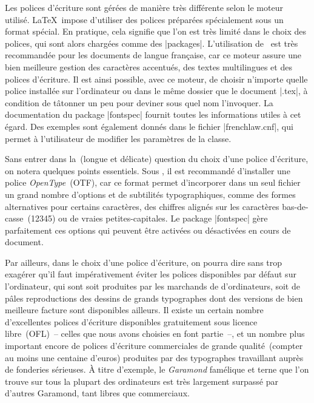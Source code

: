 Les polices d'écriture sont gérées de manière très différente selon le moteur utilisé. \LaTeX\ impose d'utiliser des polices préparées spécialement sous un format spécial. En pratique, cela signifie que l'on est très limité dans le choix des polices, qui sont alors chargées comme des |packages|. L'utilisation de \XeLaTeX\ est très recommandée pour les documents de langue française, car ce moteur assure une bien meilleure gestion des caractères accentués, des textes multilingues et des polices d'écriture. Il est ainsi possible, avec ce moteur, de choisir n'importe quelle police installée sur l'ordinateur ou dans le même dossier que le document |.tex|, à condition de tâtonner un peu pour deviner sous quel nom l'invoquer. La documentation du package |fontspec| fournit toutes les informations utiles à cet égard. Des exemples sont également donnés dans le fichier |frenchlaw.cnf|, qui permet à l'utilisateur de modifier les paramètres de la classe.

Sans entrer dans la~(longue et délicate) question du choix d'une police d'écriture, on notera quelques points essentiels. Sous \XeLaTeX, il est recommandé d'installer une police \emph{OpenType}~(OTF), car ce format permet d'incorporer dans un seul fichier un grand nombre d'options et de subtilités typographiques, comme des formes alternatives pour certains caractères, des chiffres alignés sur les caractères bas-de-casse~(12345) ou de vraies petites-capitales. Le package |fontspec| gère parfaitement ces options qui peuvent être activées ou désactivées en cours de document.

Par ailleurs, dans le choix d'une police d'écriture, on pourra dire sans trop exagérer qu'il faut impérativement éviter les polices disponibles par défaut sur l'ordinateur, qui sont soit produites par les marchands de d'ordinateurs, soit de pâles reproductions des dessins de grands typographes dont des versions de bien meilleure facture sont disponibles ailleurs. Il existe un certain nombre d'excellentes polices d'écriture disponibles gratuitement sous licence libre~(OFL)~-- celles que nous avons choisies en font partie~--, et un nombre plus important encore de polices d'écriture commerciales de grande qualité~(compter au moins une centaine d'euros) produites par des typographes travaillant auprès de fonderies sérieuses. À titre d'exemple, le \emph{Garamond} famélique et terne que l'on trouve sur tous la plupart des ordinateurs est très largement surpassé par d'autres Garamond, tant libres que commerciaux.


